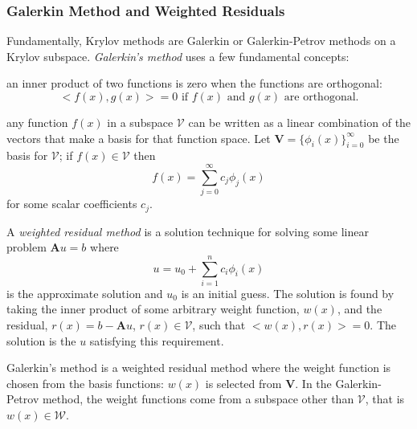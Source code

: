 \documentclass[12pt]{article}
\newcommand{\ve}[1]{\ensuremath{\mathbf{#1}}}
\begin{document}
\subsubsection*{Galerkin Method and Weighted Residuals}
Fundamentally, Krylov methods are Galerkin or Galerkin-Petrov methods on a Krylov subspace. \textit{Galerkin's method} uses a few fundamental concepts: 
\begin{compactitem}
\item an inner product of two functions is zero when the functions are orthogonal: 
\[
<f(x), g(x)> = 0\text{ if }f(x)\text{ and }g(x)\text{ are orthogonal.}
\]

\item any function $f(x)$ in a subspace $\mathcal{V}$ can be written as a linear combination of the vectors that make a basis for that function space. Let $\ve{V} = \{\phi_{i}(x) \}_{i=0}^{\infty}$ be the basis for $\mathcal{V}$; if $f(x) \in \mathcal{V}$ then 
 \[f(x) = \sum_{j=0}^{\infty} c_{j} \phi_{j}(x)\] 
 for some scalar coefficients $c_{j}$.%
  
\item A \textit{weighted residual method} is a solution technique for solving some linear problem $\ve{A}u = b$ where 
\[u = u_0 + \sum_{i=1}^{n} c_i \phi_i(x)\]
is the approximate solution and $u_{0}$ is an initial guess. The solution is found by taking the inner product of some arbitrary weight function, $w(x)$, and the residual, $r(x) = b - \ve{A}u$, $r(x) \in \mathcal{V}$, such that $<w(x), r(x)> = 0$. The solution is the $u$ satisfying this requirement. 
\end{compactitem}

Galerkin's method is a weighted residual method where the weight function is chosen from the basis functions: $w(x)$ is selected from $\ve{V}$. %
In the Galerkin-Petrov method, the weight functions come from a subspace other than $\mathcal{V}$, that is $w(x) \in \mathcal{W}$.%
\end{document}
